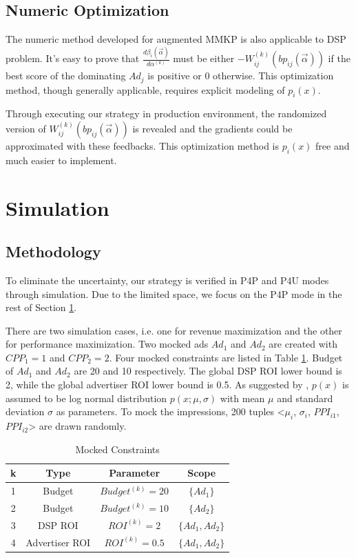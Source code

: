 \documentclass{article}
\newcommand{\sbp}{bp_{ij}}
\newcommand{\sW}{W_{ij}^{(k)}}
\newcommand{\salpha}{\alpha^{(k)}}
\newcommand{\sbeta}{\beta_i}
\newcommand{\valpha}{\vec{\alpha}}
\begin{document}
\subsection{Numeric Optimization} \label{DSPNumericOptimization}

The numeric method developed for augmented MMKP is also applicable to DSP problem.
It's easy to prove that $\frac{d\sbeta(\valpha)}{d\salpha}$ must be
    either $-\sW(\sbp(\valpha))$ if the best score of the dominating $Ad_j$ is positive or $0$ otherwise.
This optimization method, though generally applicable, requires explicit modeling of $p_i(x)$.

Through executing our strategy in production environment, the randomized version of $\sW(\sbp(\valpha))$ is revealed
    and the gradients could be approximated with these feedbacks.
This optimization method is $p_i(x)$ free and much easier to implement.

\section{Simulation} \label{Simulation}

\subsection{Methodology}

To eliminate the uncertainty, our strategy is verified in P4P and P4U modes through simulation.
Due to the limited space, we focus on the P4P mode in the rest of Section \ref{Simulation}.

There are two simulation cases, i.e. one for revenue maximization and the other for performance maximization.
Two mocked ads $Ad_1$ and $Ad_2$ are created with $CPP_1=1$ and $CPP_2=2$.
Four mocked constraints are listed in Table \ref{TableConstraints}.
Budget of $Ad_1$ and $Ad_2$ are 20 and 10 respectively.
The global DSP ROI lower bound is 2, while the global advertiser ROI lower bound is 0.5.
As suggested by \cite{YingCui2011}, $p(x)$ is assumed to be log normal distribution $p(x;\mu,\sigma)$
    with mean $\mu$ and standard deviation $\sigma$ as parameters.
To mock the impressions, 200 tuples <$\mu_i$, $\sigma_i$, $PPI_{i1}$, $PPI_{i2}$> are drawn randomly.

\begin{table}
\caption{Mocked Constraints\label{TableConstraints}}
\begin{center}
\begin{tabular}{|c|c|c|c|}
\hline
k   & Type            & Parameter           & Scope   \\
\hline
1   & Budget          & $Budget^{(k)} = 20$ & $\{Ad_1\}$        \\
\hline
2   & Budget          & $Budget^{(k)} = 10$ & $\{Ad_2\}$        \\
\hline
3   & DSP ROI         & $ROI^{(k)} = 2$     & $\{Ad_1, Ad_2\}$  \\
\hline
4   & Advertiser ROI  & $ROI^{(k)} = 0.5$   & $\{Ad_1, Ad_2\}$  \\
\hline
\end{tabular}
\end{center}
\end{table}
\end{document}
